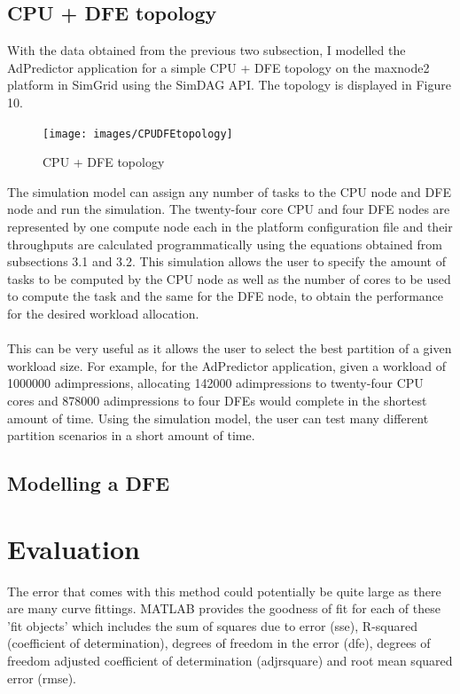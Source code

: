\documentclass[a4paper,11pt]{article}
\begin{document}
\subsection{CPU + DFE topology}
With the data obtained from the previous two subsection, I modelled the AdPredictor application for a simple CPU + DFE topology on the maxnode2 platform in SimGrid using the SimDAG API. The topology is displayed in Figure 10.

\begin{figure}[H]
	\centering
	\texttt{[image: images/CPUDFEtopology]}
	\caption{CPU + DFE topology}
\end{figure}

\noindent The simulation model can assign any number of tasks to the CPU node and DFE node and run the simulation. The twenty-four core CPU and four DFE nodes are represented by one compute node each in the platform configuration file and their throughputs are calculated programmatically using the equations obtained from subsections 3.1 and 3.2. This simulation allows the user to specify the amount of tasks to be computed by the CPU node as well as the number of cores to be used to compute the task and the same for the DFE node, to obtain the performance for the desired workload allocation.
\\\\
\noindent This can be very useful as it allows the user to select the best partition of a given workload size. For example, for the AdPredictor application, given a workload of 1000000 adimpressions, allocating 142000 adimpressions to twenty-four CPU cores and 878000 adimpressions to four DFEs would complete in the shortest amount of time. Using the simulation model, the user can test many different partition scenarios in a short amount of time.

\subsection{Modelling a DFE}

\section{Evaluation}
The error that comes with this method could potentially be quite large as there are many curve fittings. MATLAB provides the goodness of fit for each of these 'fit objects' which includes the sum of squares due to error (sse), R-squared (coefficient of determination), degrees of freedom in the error (dfe), degrees of freedom adjusted coefficient of determination (adjrsquare) and root mean squared error (rmse). 

\end{document}
